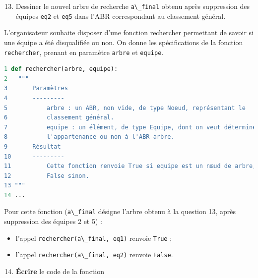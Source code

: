 \begin{enumerate}
\setcounter{enumi}{12}
\item
  Dessiner le nouvel arbre de recherche
  \passthrough{\lstinline!a\_final!} obtenu après suppression des
  équipes \passthrough{\lstinline!eq2!} et \passthrough{\lstinline!eq5!}
  dans l'ABR correspondant au classement général.
\end{enumerate}

L'organisateur souhaite disposer d'une fonction rechercher permettant de
savoir si une équipe a été disqualifiée ou non. On donne les
spécifications de la fonction \passthrough{\lstinline!rechercher!},
prenant en paramètre \passthrough{\lstinline!arbre!} et
\passthrough{\lstinline!equipe!}.

\begin{lstlisting}[language=Python]
1 def rechercher(arbre, equipe):
2   """
3       Paramètres
4       ---------
5           arbre : un ABR, non vide, de type Noeud, représentant le
6           classement général.
7           equipe : un élément, de type Equipe, dont on veut déterminer
8           l'appartenance ou non à l'ABR arbre.
9       Résultat
10      ---------
11          Cette fonction renvoie True si equipe est un nœud de arbre,
12          False sinon.
13 """
14 ...
\end{lstlisting}

Pour cette fonction (\passthrough{\lstinline!a\_final!} désigne l'arbre
obtenu à la question 13, après suppression des équipes 2 et 5) :

\begin{itemize}
\item
  l'appel \passthrough{\lstinline!rechercher(a\_final, eq1)!} renvoie
  \passthrough{\lstinline!True!} ;
\item
  l'appel \passthrough{\lstinline!rechercher(a\_final, eq2)!} renvoie
  \passthrough{\lstinline!False!}.
\end{itemize}

\begin{enumerate}
\setcounter{enumi}{13}
\item
  \textbf{Écrire} le code de la fonction
\end{enumerate}
